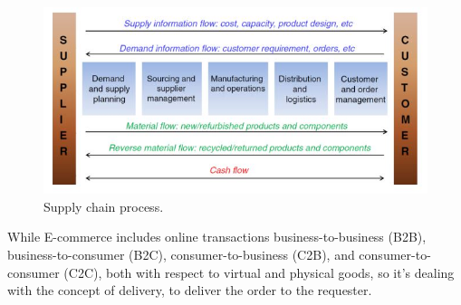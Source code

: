 \begin{figure}[H]%
    \center%
    \includegraphics[width=.9\textwidth]{images/Alaa/supplyChain.JPG}%
    \caption[Supply chain process]{Supply chain process.}\label{fig: Supply chain process}%
  \end{figure}
  
While E-commerce includes online transactions business-to-business (B2B), business-to-consumer (B2C), consumer-to-business (C2B), and consumer-to-consumer (C2C), both with respect to virtual and physical goods, so it's dealing with the concept of delivery, to deliver the order to the requester. 

